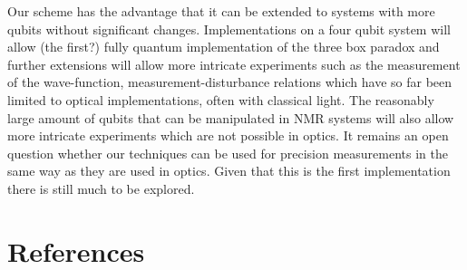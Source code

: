 \documentclass[aps,pra,12pt,onecolumn,showpacs,superscriptaddress,floatfix,footinbib,subfigure]{revtex4}
\begin{document}
Our scheme has the advantage that it can be extended to systems with more qubits without significant changes.  Implementations on a four qubit system will allow (the first?) fully quantum  implementation of the three box paradox  and further extensions will allow more intricate experiments such as the measurement of the wave-function,  measurement-disturbance relations which have so far been limited to optical implementations, often with classical light. The reasonably large amount of qubits  that can be manipulated   in NMR systems will also allow more intricate experiments which are not possible in optics.  It remains an open question whether our techniques can be used for precision measurements in the same way as they are used in optics.  Given that this is the first implementation there is still much to be explored.





\section{References}

\end{document}
